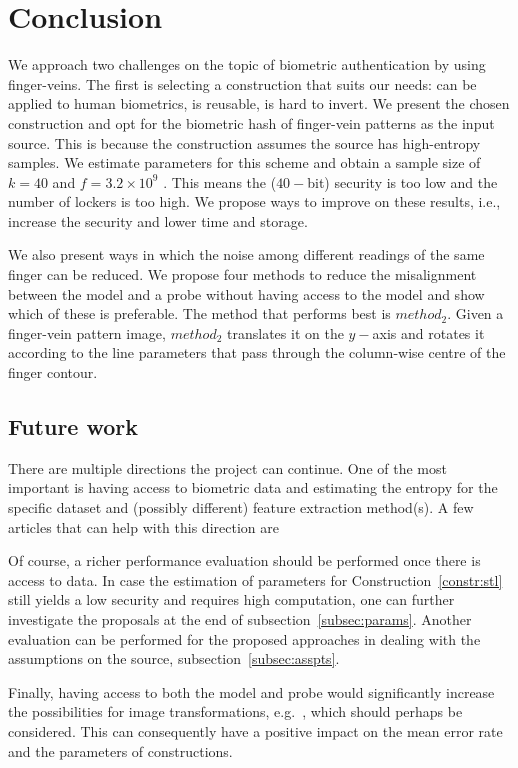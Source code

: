 \newpage
\section{Conclusion}

We approach two challenges on the topic of biometric authentication by using finger-veins.
The first is selecting a \fe construction that suits our needs: can be applied to human biometrics, is reusable, is hard to invert.
We present the chosen \rfe construction and opt for the biometric hash of finger-vein patterns as the input source. This is because the construction assumes the source has high-entropy samples. We estimate parameters for this scheme and obtain a sample size of $k=40$ and $f=3.2\times 10^9$ \dls. This means the ($40-$bit) security is too low and the number of lockers is too high.
We propose ways to improve on these results, i.e., increase the security and lower time and storage.

We also present ways in which the noise among different readings of the same finger can be reduced. We propose four methods to reduce the misalignment between the model and a probe without having access to the model and show which of these is preferable.
The method that performs best is $method_2$. Given a finger-vein pattern image, $method_2$ translates it on the $y-$axis and rotates it according to the line parameters that pass through the column-wise centre of the finger contour.

\subsection{Future work}
There are multiple directions the project can continue. One of the most important is having access to biometric data and estimating the entropy for the specific dataset and (possibly different) feature extraction method(s). A few articles that can help with this direction are~\cite{irisrfe, entropyfv}

Of course, a richer performance evaluation should be performed once there is access to data. In case the estimation of parameters for Construction~\ref{constr:stl} still yields a low security and requires high computation,  one can further investigate the proposals at the end of subsection~\ref{subsec:params}. 
Another evaluation can be performed for the proposed approaches in dealing with the assumptions on the source, subsection~\ref{subsec:asspts}.

Finally, having access to both the model and probe would significantly increase the possibilities for image transformations, e.g.~\cite{minutia}, which should perhaps be considered. This can consequently have a positive impact on the mean error rate and the parameters of \fe constructions.

